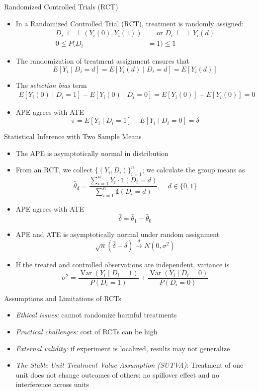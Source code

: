 \documentclass[aspectratio=1610,12pt,xcolor=dvipsnames]{beamer}
\newcommand{\indep}{\perp\!\!\!\, \perp}
\begin{document}
\begin{frame}{Randomized Controlled Trials (RCT)}
\begin{itemize}
\item In a Randomized Controlled Trial (RCT), treatment is randomly assigned:  
  \begin{align*}
  D_i \indep (Y_i(0), Y_i(1)) &\quad \text{ or } D_i \indep Y_i(d) \\
  0 \leq P(D_i&=1) \leq 1  
  \end{align*}
\item The randomization of treatment assignment ensures that  
  \[
  E[Y_i \mid D_i=d] = E[Y_i(d) \mid D_i=d] = E[Y_i(d)]
  \]
\item The \textit{selection bias} term  
  \begin{align*}
      E[Y_i(0) \mid D_i=1] - E[Y_i(0) \mid D_i=0] = E[Y_i(0)] - E[Y_i(0)] = 0
  \end{align*}
  \item APE agrees with ATE
  \[
  \pi = E[Y_i \mid D_i=1] - E[Y_i \mid D_i=0] = \delta
  \]
\end{itemize}
\end{frame}

\begin{frame}{Statistical Inference with Two Sample Means}
\begin{itemize}
\item The APE is asymptotically normal in distribution
\item From an RCT, we collect \(\{(Y_i, D_i)\}_{i=1}^n\); we calculate the group means as 
  \[
  \hat{\theta}_d = \frac{\sum_{i=1}^n Y_i \cdot \mathds{1}(D_i = d)}{\sum_{i=1}^n \mathds{1}(D_i = d)}, \quad d \in \{0,1\}
  \]
\item APE agrees with ATE  
  \[
  \hat{\delta} = \hat{\theta}_1 - \hat{\theta}_0
  \]
\item APE and ATE is asymptotically normal under random assignment 
  \[
  \sqrt{n}(\hat{\delta} - \delta) \overset{d}{\to} N(0, \sigma^2) 
  \]
 \item If the treated and controlled observations are independent, variance is
\[
\sigma^2 = \frac{\operatorname{Var}(Y_i \mid D_i=1)}{P(D_i=1)} 
  + \frac{\operatorname{Var}(Y_i \mid D_i=0)}{P(D_i=0)}
\]
\end{itemize}
\end{frame}

\begin{frame}{Assumptions and Limitations of RCTs}
\begin{itemize} 
\item \textit{Ethical issues:} cannot randomize harmful treatments 
\item \textit{Practical challenges:} cost of RCTs can be high
\item \textit{External validity:} if experiment is localized, results may not generalize \pause
\item \textit{The Stable Unit Treatment Value Assumption (SUTVA)}: Treatment of one unit does not change outcomes of others; no spillover effect and no interference across units
\end{itemize}
\end{frame}
\end{document}
